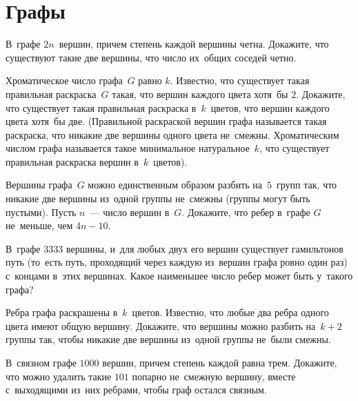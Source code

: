 
\section*{Графы}


\begin{problems}

\item
В~графе $2 n$~вершин, причем степень каждой вершины четна.
Докажите, что существуют такие две вершины, что число их~общих соседей четно.

\item
Хроматическое число графа~$G$ равно $k$.
Известно, что существует такая правильная раскраска~$G$ такая, что вершин
каждого цвета хотя~бы $2$.
Докажите, что существует такая правильная раскраска в~$k$~цветов, что вершин
каждого цвета хотя~бы две.
(Правильной раскраской вершин графа называется такая раскраска, что никакие две
вершины одного цвета не~смежны.
Хроматическим числом графа называется такое минимальное натуральное~$k$, что
существует правильная раскраска вершин в~$k$~цветов).

\item
Вершины графа~$G$ можно единственным образом разбить на~$5$~групп так, что
никакие две вершины из~одной группы не~смежны (группы могут быть пустыми).
Пусть $n$~--- число вершин в~$G$.
Докажите, что ребер в~графе $G$ не~меньше, чем $4 n - 10$.

\item
В~графе $3333$ вершины, и~для любых двух его вершин существует гамильтонов путь
(то~есть путь, проходящий через каждую из~вершин графа ровно один раз)
с~концами в~этих вершинах.
Какое наименьшее число ребер может быть у~такого графа?

\item
Ребра графа раскрашены в~$k$~цветов.
Известно, что любые два ребра одного цвета имеют общую вершину.
Докажите, что вершины можно разбить на~$k + 2$ группы так, чтобы никакие две
вершины из~одной группы не~были смежны.

\item
В~связном графе $1000$ вершин, причем степень каждой равна трем.
Докажите, что можно удалить такие $101$ попарно не~смежную вершину, вместе
с~выходящими из~них ребрами, чтобы граф остался связным.


\end{problems}
